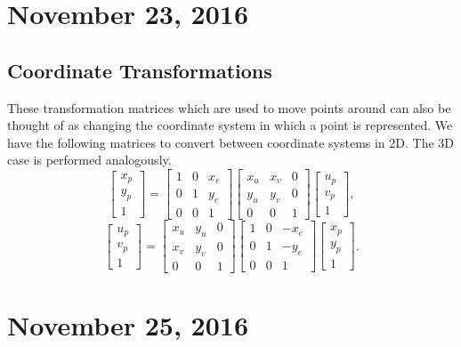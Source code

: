 \documentclass[11pt]{article}
\theoremstyle{plain} %
\theoremstyle{definition}
\theoremstyle{example}
\theoremstyle{remark}
\begin{document}
 \section{November 23, 2016}
\subsection{Coordinate Transformations}

These transformation matrices which are used to move points around can also be thought of as changing the coordinate system in which a point is represented. We have the following matrices to convert between coordinate systems in 2D. The 3D case is performed analogously. 
$$\begin{bmatrix}x_p\\y_p \\ 1\end{bmatrix} = \begin{bmatrix}1 & 0 & x_e \\ 0 & 1 & y_e \\ 0 & 0 & 1\end{bmatrix} \begin{bmatrix}x_u & x_v & 0 \\ y_u & y_v & 0 \\ 0 & 0 & 1\end{bmatrix}\begin{bmatrix}u_p\\v_p \\ 1\end{bmatrix},$$
$$\begin{bmatrix}u_p\\v_p \\ 1\end{bmatrix} = \begin{bmatrix}x_u & y_u & 0 \\ x_v & y_v & 0 \\ 0 & 0 & 1\end{bmatrix}\begin{bmatrix}1 & 0 & -x_e \\ 0 & 1 & -y_e \\ 0 & 0 & 1\end{bmatrix} \begin{bmatrix}x_p\\y_p \\ 1\end{bmatrix}.$$

\section{November 25, 2016}
\end{document}
